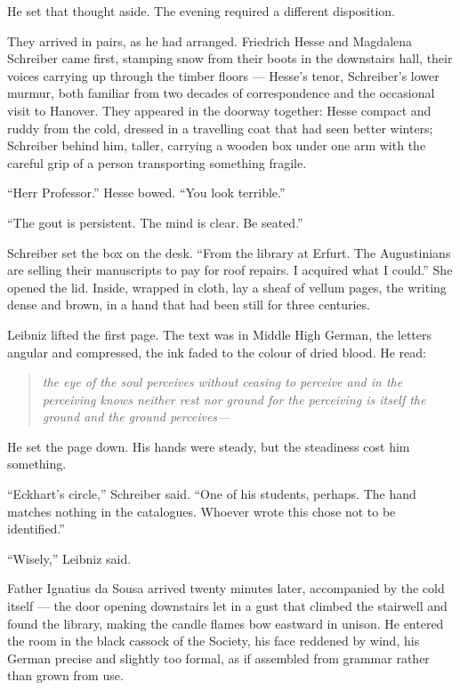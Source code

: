 He set that thought aside. The evening required a different disposition.

\scenebreak

They arrived in pairs, as he had arranged. Friedrich Hesse and Magdalena Schreiber came first, stamping snow from their boots in the downstairs hall, their voices carrying up through the timber floors --- Hesse's tenor, Schreiber's lower murmur, both familiar from two decades of correspondence and the occasional visit to Hanover. They appeared in the doorway together: Hesse compact and ruddy from the cold, dressed in a travelling coat that had seen better winters; Schreiber behind him, taller, carrying a wooden box under one arm with the careful grip of a person transporting something fragile.

``Herr Professor.'' Hesse bowed. ``You look terrible.''

``The gout is persistent. The mind is clear. Be seated.''

Schreiber set the box on the desk. ``From the library at Erfurt. The Augustinians are selling their manuscripts to pay for roof repairs. I acquired what I could.'' She opened the lid. Inside, wrapped in cloth, lay a sheaf of vellum pages, the writing dense and brown, in a hand that had been still for three centuries.

Leibniz lifted the first page. The text was in Middle High German, the letters angular and compressed, the ink faded to the colour of dried blood. He read:

\begin{quote}
\emph{the eye of the soul perceives without ceasing to perceive and in the perceiving knows neither rest nor ground for the perceiving is itself the ground and the ground perceives---}
\end{quote}

He set the page down. His hands were steady, but the steadiness cost him something.

``Eckhart's circle,'' Schreiber said. ``One of his students, perhaps. The hand matches nothing in the catalogues. Whoever wrote this chose not to be identified.''

``Wisely,'' Leibniz said.

\scenebreak

Father Ignatius da Sousa arrived twenty minutes later, accompanied by the cold itself --- the door opening downstairs let in a gust that climbed the stairwell and found the library, making the candle flames bow eastward in unison. He entered the room in the black cassock of the Society, his face reddened by wind, his German precise and slightly too formal, as if assembled from grammar rather than grown from use.

